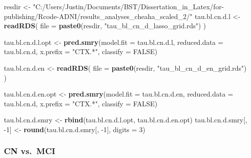 \documentclass[
]{article}
\newenvironment{Shaded}{\begin{snugshade}}{\end{snugshade}}
\newcommand{\DataTypeTok}[1]{\textcolor[rgb]{0.13,0.29,0.53}{#1}}
\newcommand{\DecValTok}[1]{\textcolor[rgb]{0.00,0.00,0.81}{#1}}
\newcommand{\KeywordTok}[1]{\textcolor[rgb]{0.13,0.29,0.53}{\textbf{#1}}}
\newcommand{\NormalTok}[1]{#1}
\newcommand{\OtherTok}[1]{\textcolor[rgb]{0.56,0.35,0.01}{#1}}
\newcommand{\StringTok}[1]{\textcolor[rgb]{0.31,0.60,0.02}{#1}}
\begin{document}
\begin{Shaded}
\begin{Highlighting}[]
\NormalTok{resdir <-}\StringTok{ "C:/Users/Justin/Documents/BST/Dissertation_in_Latex/for-publishing/Rcode-ADNI/results_analyses_cheaha_scaled_2/"}
\NormalTok{tau.bl.cn.d.l <-}\StringTok{ }\KeywordTok{readRDS}\NormalTok{(}
  \DataTypeTok{file =} \KeywordTok{paste0}\NormalTok{(resdir, }\StringTok{"tau_bl_cn_d_lasso_grid.rds"}\NormalTok{)}
\NormalTok{)}

\NormalTok{tau.bl.cn.d.l.opt <-}\StringTok{ }\KeywordTok{pred.smry}\NormalTok{(}\DataTypeTok{model.fit =}\NormalTok{ tau.bl.cn.d.l,}
                       \DataTypeTok{reduced.data =}\NormalTok{ tau.bl.cn.d,}
                       \DataTypeTok{x.prefix =} \StringTok{"CTX.*"}\NormalTok{,}
                       \DataTypeTok{classify =} \OtherTok{FALSE}\NormalTok{)}

\NormalTok{tau.bl.cn.d.en <-}\StringTok{ }\KeywordTok{readRDS}\NormalTok{(}
  \DataTypeTok{file =} \KeywordTok{paste0}\NormalTok{(resdir, }\StringTok{"tau_bl_cn_d_en_grid.rds"}\NormalTok{)}
\NormalTok{)}

\NormalTok{tau.bl.cn.d.en.opt <-}\StringTok{ }\KeywordTok{pred.smry}\NormalTok{(}\DataTypeTok{model.fit =}\NormalTok{ tau.bl.cn.d.en,}
                       \DataTypeTok{reduced.data =}\NormalTok{ tau.bl.cn.d,}
                       \DataTypeTok{x.prefix =} \StringTok{"CTX.*"}\NormalTok{,}
                       \DataTypeTok{classify =} \OtherTok{FALSE}\NormalTok{)}

\NormalTok{tau.bl.cn.d.smry <-}\StringTok{ }\KeywordTok{rbind}\NormalTok{(tau.bl.cn.d.l.opt,}
\NormalTok{                          tau.bl.cn.d.en.opt)}
\NormalTok{tau.bl.cn.d.smry[, }\DecValTok{-1}\NormalTok{] <-}\StringTok{ }\KeywordTok{round}\NormalTok{(tau.bl.cn.d.smry[, }\DecValTok{-1}\NormalTok{], }\DataTypeTok{digits =} \DecValTok{3}\NormalTok{)}
\end{Highlighting}
\end{Shaded}

\hypertarget{cn-vs.-mci-1}{%
\subsubsection{CN vs.~MCI}\label{cn-vs.-mci-1}}
\end{document}

